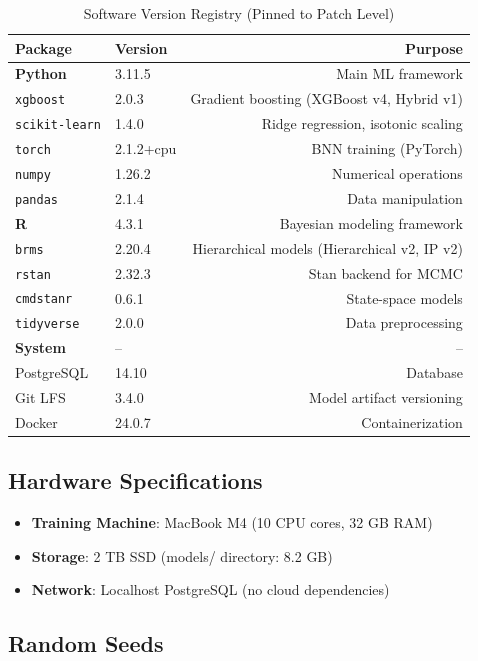 \begin{table}[htbp]
\centering
\caption{Software Version Registry (Pinned to Patch Level)}
\label{tab:software-versions}
\begin{tabular}{llr}
\toprule
\textbf{Package} & \textbf{Version} & \textbf{Purpose} \\
\midrule
\textbf{Python} & 3.11.5 & Main ML framework \\
\texttt{xgboost} & 2.0.3 & Gradient boosting (XGBoost v4, Hybrid v1) \\
\texttt{scikit-learn} & 1.4.0 & Ridge regression, isotonic scaling \\
\texttt{torch} & 2.1.2+cpu & BNN training (PyTorch) \\
\texttt{numpy} & 1.26.2 & Numerical operations \\
\texttt{pandas} & 2.1.4 & Data manipulation \\
\midrule
\textbf{R} & 4.3.1 & Bayesian modeling framework \\
\texttt{brms} & 2.20.4 & Hierarchical models (Hierarchical v2, IP v2) \\
\texttt{rstan} & 2.32.3 & Stan backend for MCMC \\
\texttt{cmdstanr} & 0.6.1 & State-space models \\
\texttt{tidyverse} & 2.0.0 & Data preprocessing \\
\midrule
\textbf{System} & -- & -- \\
PostgreSQL & 14.10 & Database \\
Git LFS & 3.4.0 & Model artifact versioning \\
Docker & 24.0.7 & Containerization \\
\bottomrule
\end{tabular}
\end{table}

\subsection{Hardware Specifications}

\begin{itemize}
\item \textbf{Training Machine}: MacBook M4 (10 CPU cores, 32 GB RAM)
\item \textbf{Storage}: 2 TB SSD (models/ directory: 8.2 GB)
\item \textbf{Network}: Localhost PostgreSQL (no cloud dependencies)
\end{itemize}

\subsection{Random Seeds}

